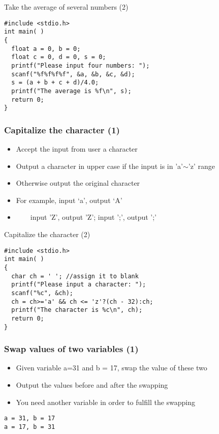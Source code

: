 \ifx\answer\undefined
\begin{frame}[fragile]{Take the average of several numbers (2)}
\begin{lstlisting}[xleftmargin=0.05\linewidth, linewidth=0.85\linewidth]
#include <stdio.h>
int main( )
{
  float a = 0, b = 0;
  float c = 0, d = 0, s = 0;
  printf("Please input four numbers: ");
  scanf("%f%f%f%f", &a, &b, &c, &d);
  s = (a + b + c + d)/4.0;
  printf("The average is %f\n", s);
  return 0;
}
\end{lstlisting}
\end{frame}

\fi

\begin{frame}
\frametitle{Capitalize the character (1)}
\begin{itemize}
	\item {Accept the input from user a character}
	\item {Output a character in upper case if the input is in 'a'$\sim$'z' range}
	\item {Otherwise output the original character}
	\item {For example, input `a', output `A'}
	\item {~~~~input 'Z', output 'Z'; input ';', output ';'}
\end{itemize}

\end{frame}

\ifx\answer\undefined
\begin{frame}[fragile]{Capitalize the character (2)}
\begin{lstlisting}[xleftmargin=0.05\linewidth, linewidth=0.85\linewidth]
#include <stdio.h>
int main( )
{
  char ch = ' '; //assign it to blank
  printf("Please input a character: ");
  scanf("%c", &ch);
  ch = ch>='a' && ch <= 'z'?(ch - 32):ch;
  printf("The character is %c\n", ch);
  return 0;
}
\end{lstlisting}
\end{frame}
\fi

\begin{frame}[fragile]
\frametitle{Swap values of two variables (1)}
\begin{itemize}
	\item {Given variable a=31 and b = 17, swap the value of these two}
	\item {Output the values before and after the swapping}
	\item {You need another variable in order to fulfill the swapping}
\end{itemize}
\begin{lstlisting}[xleftmargin=0.05\linewidth, linewidth=0.85\linewidth]
a = 31, b = 17
a = 17, b = 31
\end{lstlisting}

\end{frame}

